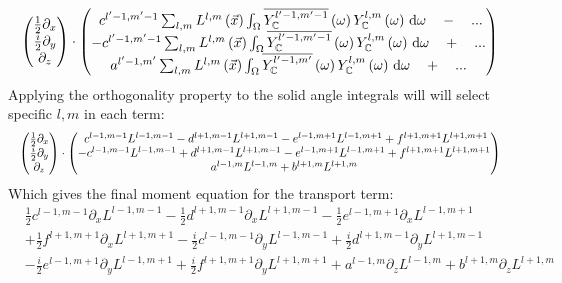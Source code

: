 \begin{align*}
\begin{pmatrix}
\frac{1}{2}\partial_x\\
\frac{i}{2}\partial_y\\
\partial_z
\end{pmatrix}
\cdot
\begin{pmatrix}
\ c^{l'-1, m'-1}\sum_{l,m}{L^{l,m}\left(\vec{x}\right )\int_\Omega{\overline{Y_{\mathbb{C}}^{l'-1,m'-1}}\left(\omega\right)Y_{\mathbb{C}}^{l,m}\left(\omega\right)\,\mathrm{d}\omega}} \quad - \quad ...\\
-c^{l'-1, m'-1}\sum_{l,m}{L^{l,m}\left(\vec{x}\right )\int_\Omega{\overline{Y_{\mathbb{C}}^{l'-1,m'-1}}\left(\omega\right)Y_{\mathbb{C}}^{l,m}\left(\omega\right)\,\mathrm{d}\omega}} \quad + \quad ... \\
a^{l'-1, m'}\sum_{l,m}{L^{l,m}\left(\vec{x}\right )\int_\Omega{\overline{Y_{\mathbb{C}}^{l'-1,m'}}\left(\omega\right)Y_{\mathbb{C}}^{l,m}\left(\omega\right)\,\mathrm{d}\omega}} \quad + \quad ...
\end{pmatrix}
\end{align*}
Applying the orthogonality property to the solid angle integrals will will select specific $l,m$ in each term:
\begin{equation*}
\resizebox{1.0\hsize}{!}{$
\begin{pmatrix}
\frac{1}{2}\partial_x\\
\frac{i}{2}\partial_y\\
\partial_z
\end{pmatrix}
\cdot
\begin{pmatrix}
\ c^{l-1, m-1}L^{l-1,m-1} - d^{l+1, m-1}L^{l+1,m-1} - e^{l-1, m+1}L^{l-1,m+1} + f^{l+1, m+1}L^{l+1,m+1}\\
-c^{l-1, m-1}L^{l-1,m-1} + d^{l+1, m-1}L^{l+1,m-1} - e^{l-1, m+1}L^{l-1,m+1} + f^{l+1, m+1}L^{l+1,m+1} \\
a^{l-1, m}L^{l-1,m}+b^{l+1, m}L^{l+1,m}
\end{pmatrix}
$}
\end{equation*}
Which gives the final moment equation for the transport term:
\begin{align}
&
\frac{1}{2}c^{l-1, m-1}\partial_x L^{l-1,m-1}
-\frac{1}{2}d^{l+1, m-1}\partial_x L^{l+1,m-1}
-\frac{1}{2}e^{l-1, m+1}\partial_x L^{l-1,m+1}
\nonumber
\\
&
+\frac{1}{2}f^{l+1, m+1}\partial_x L^{l+1,m+1}
-\frac{i}{2}c^{l-1, m-1}\partial_y L^{l-1,m-1}
+\frac{i}{2}d^{l+1, m-1}\partial_y L^{l+1,m-1}
\nonumber
\\
&
-\frac{i}{2}e^{l-1, m+1}\partial_y L^{l-1,m+1}
+\frac{i}{2}f^{l+1, m+1}\partial_y L^{l+1,m+1}
+
a^{l-1, m}\partial_z L^{l-1,m}+b^{l+1, m}\partial_z L^{l+1,m}
\label{eq:sh_complex_transport}
\end{align}

